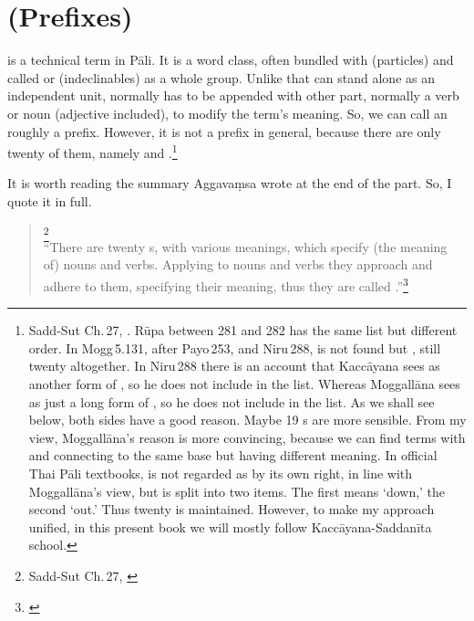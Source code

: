 \chapter{ (Prefixes)}\label{chap:upasagga}

 is a technical term in P\=ali. It is a word class, often bundled with  (particles) and called  or  (indeclinables) as a whole group. Unlike  that can stand alone as an independent unit,  normally has to be appended with other part, normally a verb or noun (adjective included), to modify the term's meaning. So, we can call an  roughly a prefix. However, it is not a prefix in general, because there are only twenty of them, namely  and .\footnote{Sadd-Sut Ch.\,27, \citealp[p.~880]{smith:sadd3}. R\=upa between 281 and 282 has the same list but different order. In Mogg\,5.131, after Payo\,253, and Niru\,288,  is not found but , still twenty altogether. In Niru\,288 there is an account that Kacc\=ayana sees  as another form of , so he does not include  in the list. Whereas Moggall\=ana sees  as just a long form of , so he does not include  in the list. As we shall see below, both sides have a good reason. Maybe 19 s are more sensible. From my view, Moggall\=ana's reason is more convincing, because we can find terms with  and  connecting to the same base but having different meaning. In official Thai P\=ali textbooks,  is not regarded as  by its own right, in line with Moggall\=ana's view, but  is split into two items. The first  means `down,' the second `out.' Thus twenty  is maintained. However, to make my approach unified, in this present book we will mostly follow Kacc\=ayana-Saddan\=ita school.}

It is worth reading the summary Aggava\d msa wrote at the end of the  part. So, I quote it in full.

\begin{quote}
\footnote{Sadd-Sut Ch.\,27, \citealp[p.~886]{smith:sadd3}} \\[1.5mm]
``There are twenty s, with various meanings, which specify (the meaning of) nouns and verbs. Applying to nouns and verbs they approach and adhere to them, specifying their meaning, thus they are called .''\footnote{\citealp[p.~125]{collins:grammar}}
\end{quote}

